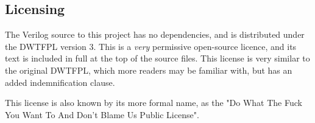 \subsection{Licensing}

The Verilog source to this project has no dependencies, and is distributed under the DWTFPL version 3. This is a {\it very} permissive open-source licence, and its text is included in full at the top of the source files. This license is very similar to the original DWTFPL, which more readers may be familiar with, but has an added indemnification clause.

This license is also known by its more formal name, as the "Do What The Fuck You Want To And Don't Blame Us Public License".
